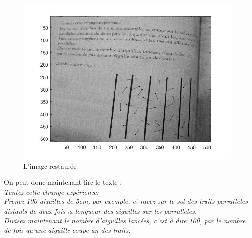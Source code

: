 \documentclass[10pt,a4paper]{article}
\begin{document}
\begin{figure}[H]	\begin{center}
\includegraphics[scale=0.35]{im_restauree.jpg}
\caption{L'image restaurée}
\label{s1demod}
\end{center}	\end{figure}

On peut donc maintenant lire le texte : 
\textit{\\Tentez cette étrange expérience:\\
Prenez 100 aiguilles de 5cm, par exemple, et racez sur le sol des traits parrallèles distants de deux fois la longueur des aiguilles sur les parrallèles.\\
Divisez maintenant le nombre d'aiguilles lancées, c'est à dire 100, par le nombre de fois qu'une aiguille coupe un des traits.}
\end{document}
